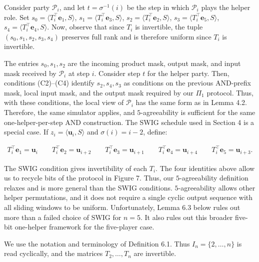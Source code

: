 Consider party $\mathcal{P}_{i}$, and let $t=\sigma^{-1}(i)$ be the step in which
$\mathcal{P}_{i}$ plays the helper role. Set
$s_{0}=\langle T_{i}^{\top}\mathbf{e}_{1},S\rangle$,
$s_{1}=\langle T_{i}^{\top}\mathbf{e}_{3},S\rangle$,
$s_{2}=\langle T_{i}^{\top}\mathbf{e}_{2},S\rangle$,
$s_{3}=\langle T_{i}^{\top}\mathbf{e}_{5},S\rangle$,
$s_{4}=\langle T_{i}^{\top}\mathbf{e}_{4},S\rangle$.
Now, observe that since $T_{i}$ is invertible, the tuple
$(s_{0},s_{1},s_{2},s_{3},s_{4})$ preserves full rank and is therefore uniform since $T_{i}$ is invertible.\par




The entries $s_{0},s_{1},s_{2}$ are the incoming product mask, output mask, and input
mask received by $\mathcal{P}_{i}$ at step $i$. Consider step $t$ for the helper party. Then, conditions
(C2)–(C4) identify $s_{2},s_{4},s_{3}$ as conditions on the previous AND-prefix mask, local input mask, and the output
mask required by our $\Pi_{1}$ protocol. Thus, with these conditions, the local view of $\mathcal{P}_{i}$ has the same
form as in Lemma 4.2. Therefore, the same simulator applies, and
$5$-agreeability is sufficient for the same one-helper-per-step AND
construction.
The SWIG schedule used in Section 4 is a special case. If $z_{i}=\langle\mathbf{u}_{i},S\rangle$ and $\sigma(i)=i-2$, define:\par


\[\begin{gathered}
T_{i}^{\top}\mathbf{e}_{1}=\mathbf{u}_{i}\qquad T_{i}^{\top}\mathbf{e}_{2}=\mathbf{u}_{i+2}\qquad T_{i}^{\top}\mathbf{e}_{3}=\mathbf{u}_{i+1}\qquad T_{i}^{\top}\mathbf{e}_{4}=\mathbf{u}_{i+4}\qquad T_{i}^{\top}\mathbf{e}_{5}=\mathbf{u}_{i+3}.
\end{gathered}\]




The SWIG condition gives invertibility of each $T_{i}$. The four identities above allow us to recycle bits of the protocol in Figure 7. Thus, our $5$-agreeability definition relaxes and is more general than the SWIG conditions. $5$-agreeability allows other helper permutations, and it does not require a single cyclic output sequence with all sliding windows to be uniform. Unfortunately, Lemma 6.3 below rules out more than a failed choice of SWIG for $n=5$. It also rules out this broader five-bit one-helper framework for the five-player case.\par




We use the notation and terminology of Definition 6.1. Thus $I_{n}=\{2,\ldots,n\}$ is read cyclically, and the matrices $T_{2},\ldots,T_{n}$ are invertible.\par



